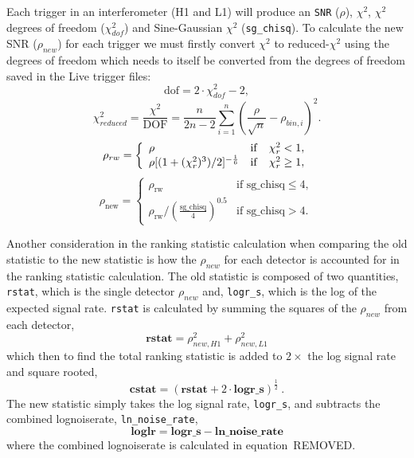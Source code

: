Each trigger in an interferometer (H1 and L1) will produce an \verb|SNR| ($\rho$), $\chi^{2}$, $\chi^{2}$ degrees of freedom ($\chi^{2}_{dof}$) and Sine-Gaussian $\chi^{2}$ (\verb|sg_chisq|). To calculate the new SNR ($\rho_{new}$) for each trigger we must firstly convert $\chi^{2}$ to reduced-$\chi^{2}$ using the degrees of freedom which needs to itself be converted from the degrees of freedom saved in the Live trigger files:
%
\begin{equation}
\text{dof} = 2 \cdot \chi^{2}_{dof} - 2,
\end{equation}
%
\begin{equation}
  \chi_{reduced}^{2} = \frac{\chi^{2}}{\textrm{DOF}} = \frac{n}{2n - 2} \sum_{i=1}^n \left(\frac{\rho}{\sqrt{n}} - \rho_{bin,i}\right)^2.
  \label{2:eqn:chi_squared}
\end{equation}
%
\begin{equation}
\rho_{rw} =  \left\{  \begin{array}{l@{\quad}cr} 
\rho & \mathrm{if} & \chi_{r}^{2} < 1, \\  
\rho [(1 + (\chi_{r}^{2})^3)/2]^{-\frac{1}{6}} &  \mathrm{if} & \chi_{r}^{2} \ge 1,   
\end{array}\right.
\label{2:eqn:allen-reweighting}
\end{equation}
%
\begin{equation}
\rho_{\text{new}} = 
\begin{cases} 
\rho_{\text{rw}} & \text{if } \text{sg\_chisq} \leq 4, \\  
\rho_{\text{rw}}  / \left(\frac{\text{sg\_chisq}}{4}\right)^{0.5} & \text{if } \text{sg\_chisq} > 4.
\end{cases}
\label{2:eqn:sg-reweighting}
\end{equation}

Another consideration in the ranking statistic calculation when comparing the old statistic to the new statistic is how the $\rho_{new}$ for each detector is accounted for in the ranking statistic calculation. The old statistic is composed of two quantities, \verb|rstat|, which is the single detector $\rho_{new}$ and, \verb|logr_s|, which is the log of the expected signal rate. \verb|rstat| is calculated by summing the squares of the $\rho_{new}$ from each detector,
%
\begin{equation}
    \textbf{rstat} = \rho_{new, H1}^{2} + \rho_{new, L1}^{2}
\end{equation}
%
which then to find the total ranking statistic is added to $2 \times$ the log signal rate and square rooted,
%
\begin{equation}
    \textbf{cstat} = (\textbf{rstat} + 2 \cdot \textbf{logr\_s})^{\frac{1}{2}} \ .
\end{equation}
%
The new statistic simply takes the log signal rate, \verb|logr_s|, and subtracts the combined lognoiserate, \verb|ln_noise_rate|,
%
\begin{equation}
    \textbf{loglr} = \textbf{logr\_s} - \textbf{ln\_noise\_rate}
\end{equation}
%
where the combined lognoiserate is calculated in equation~REMOVED.

